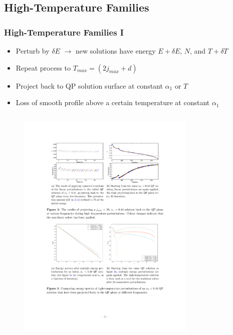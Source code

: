 \documentclass[mathserif,10pt]{beamer}
\newcommand{\bi}{\begin{itemize}}
\newcommand{\ei}{\end{itemize}}
\newcommand{\its}{\item}
\newcommand{\jm}{j_{max}}
\begin{document}
\subsection{High-Temperature Families}
\frame
{
  \frametitle{High-Temperature Families I}
  \bi
  \its Perturb by $\delta E$ $\to$ new solutions have energy $E + \delta E$, $N$, and $T + \delta T$
  \its Repeat process to $T_{max} = (2\jm + d)$
  \its Project back to QP solution surface at constant $\alpha_1$ or $T$
  \its Loss of smooth profile above a certain temperature at \alert<1>{constant $\alpha_1$} 
  \ei
  
  \vspace{-0.15in}
  \begin{columns}
  \begin{figure}
  \centering
  \hspace{0.1in}
  \includegraphics[scale=0.75]{reop5}
  \end{figure}
  \begin{figure}

\end{figure}
\end{columns}}
\end{document}
